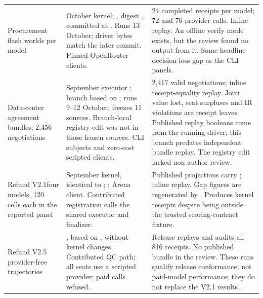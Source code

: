 \begin{longtable}{@{}P{1.28in}P{2.18in}P{3.06in}@{}}
\addlinespace[4pt]
Procurement flash worlds per model
& October kernel; , digest , committed at . Runs 13 October; driver bytes match the later commit. Pinned OpenRouter clients.
& 24 completed receipts per model; 72 and 76 provider calls. Inline replay. An offline verify mode exists, but the review found no output from it. Same headline decision-loss gap as the CLI panels.\\
\addlinespace[4pt]
Data-center agreement bundles; 2,456 negotiations
& September executor ; branch based on ; runs 9--12 October.  freezes 11 sources. Branch-local registry edit  was not in those frozen sources. CLI subjects and zero-cost scripted clients.
& 2,417 valid negotiations; inline receipt-equality replay. Joint value lost, seat surpluses and IR violations are receipt leaves. Published replay booleans come from the running driver; this branch predates independent bundle replay. The registry edit lacked non-author review.\\
\addlinespace[4pt]
Refund V2.1\newline four models, 120 cells each in the reported panel
& September kernel, identical to ; ; Arena client. Contributed registration calls the shared executor and finalizer.
& Published projections carry ; inline replay. Gap figures are regenerated by . Produces kernel receipts despite being outside the trusted scoring-contract fixture.\\
\addlinespace[4pt]
Refund V2.5 provider-free trajectories
& , based on , without kernel changes. Contributed QC path; all seats use a scripted provider; paid calls refused.
& Release replays and audits all 816 receipts. No published bundle in the review. These runs qualify release conformance, not paid-model performance; they do not replace the V2.1 results.\\
\end{longtable}
\endgroup
